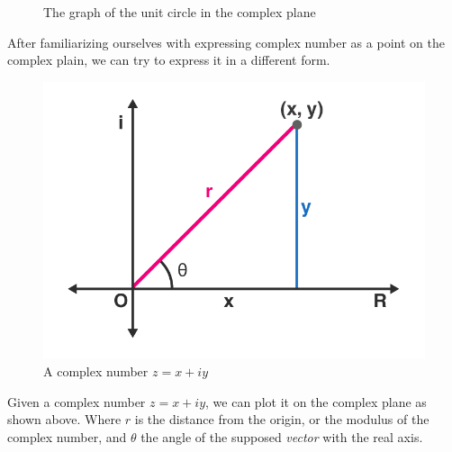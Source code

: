\documentclass[12pt]{book}
\begin{document}
\begin{figure}[!h]
    \centering
    \caption{The graph of the unit circle in the complex plane}
    \label{fig:1.2}
\end{figure}

After familiarizing ourselves with expressing complex number as a point on the complex plain, we can try to express it in a different form. 
\begin{figure}[!h]
    \centering
    \includegraphics[width=0.5\linewidth]{pictures/pic1.3.1.png}
    \caption{A complex number $z = x+iy$}
    \label{fig:1.3}
\end{figure}
Given a complex number $z = x+iy$, we can plot it on the complex plane as shown above. Where $r$ is the distance from the origin, or the modulus of the complex number, and $\theta$ the angle of the supposed \textit{vector} with the real axis. 
\end{document}
